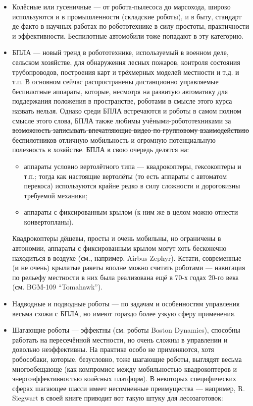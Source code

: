 \documentclass{../../text-style}
\begin{document}
\begin{itemize}
    \item Колёсные или гусеничные --- от робота-пылесоса до марсохода, широко используются и в промышленности (складские роботы), и в быту, стандарт де-факто в научных работах по робототехнике в силу простоты, практичности и эффективности.
    Беспилотные автомобили тоже попадают в эту категорию.
    \item БПЛА --- новый тренд в робототехнике, используемый в военном деле, сельском хозяйстве, для обнаружения лесных пожаров, контроля состояния трубопроводов, построения карт и трёхмерных моделей местности и т.д. и т.п.
    В основном сейчас распространены дистанционно управляемые беспилотные аппараты, которые, несмотря на развитую автоматику для поддержания положения в пространстве, роботами в смысле этого курса назвать нельзя.
    Однако среди БПЛА встречаются и роботы в самом полном смысле этого слова, БПЛА также любимы учёными-робототехниками за \sout{возможность записывать впечатляющие видео по групповому взаимодействию беспилотников} отличную мобильность и огромную потенциальную полезность в хозяйстве.
    БПЛА в свою очередь делятся на:
    \begin{itemize}
        \item аппараты условно вертолётного типа --- квадрокоптеры, гексокоптеры и т.п.; тогда как настоящие вертолёты (то есть аппараты с автоматом перекоса) используются крайне редко в силу сложности и дороговизны требуемой механики;
        \item аппараты с фиксированным крылом (к ним же в целом можно отнести конвертопланы).
    \end{itemize}
    Квадрокоптеры дёшевы, просты и очень мобильны, но ограничены в автономии, аппараты с фиксированным крылом могут хоть бесконечно находиться в воздухе (см., например, Airbus Zephyr).
    Кстати, современные (и не очень) крылатые ракеты вполне можно считать роботами --- навигация по рельефу местности в них была реализована ещё в 70-х годах 20-го века (см. BGM-109 \foreignquote{english}{Tomahawk}).
    \item Надводные и подводные роботы --- по задачам и особенностям управления весьма схожи с БПЛА, но имеют гораздо более узкую сферу применения.
    \item Шагающие роботы --- эффектны (см. роботы Boston Dynamics), способны работать на пересечённой местности, но очень сложны в управлении и довольно неэффективны.
    На практике особо не применяются, хотя робособаки, которые, безусловно, тоже шагающие роботы, выглядят весьма многообещающе (как компромисс между мобильностью квадрокоптеров и энергоэффективностью колёсных платформ). В некоторых специфических сферах шагающее шасси имеет несомненные преимущества --- например, R. Siegwart в своей книге приводит вот такую штуку для лесозаготовок:

\end{itemize}
\end{document}
